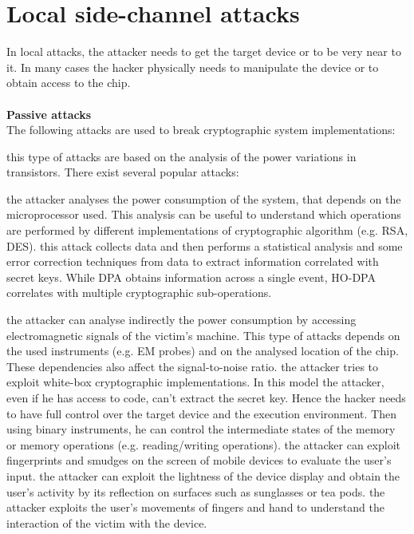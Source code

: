\section{Local side-channel attacks}
In local attacks, the attacker needs to get the target device or to be very near to it. In many cases the hacker physically needs to manipulate the device or to obtain access to the chip.\\\\
\textbf{Passive attacks}\\
The following attacks are used to break cryptographic system implementations:
\begin{itemize}
{this type of attacks are based on the analysis of the power variations in transistors. There exist several popular attacks\cite{intro_DPA}:
\begin{itemize}
{the attacker analyses the power consumption of the system, that depends on the microprocessor used. This analysis can be useful to understand which operations are performed by different implementations of cryptographic algorithm (e.g. RSA, DES).}
{this attack collects data and then performs a statistical analysis and some error correction techniques from data to extract information correlated with secret keys.}
{While DPA obtains information across a single event, HO-DPA correlates with multiple cryptographic sub-operations.}
\end{itemize}}
{the attacker can analyse indirectly the power consumption by accessing electromagnetic signals of the victim's machine. This type of attacks depends on the used instruments (e.g. EM probes) and on the analysed location of the chip. These dependencies also affect the signal-to-noise ratio.}
{the attacker tries to exploit white-box cryptographic implementations. In this model the attacker, even if he has access to code, can't extract the secret key. Hence the hacker needs to have full control over the target device and the execution environment. Then using binary instruments, he can control the intermediate states of the memory or memory operations (e.g. reading/writing operations)\cite{side_DCA}.}
{the attacker can exploit fingerprints and smudges on the screen of mobile devices to evaluate the user's input.}
{the attacker can exploit the lightness of the device display and obtain the user's activity by its reflection on surfaces such as sunglasses or tea pods.}
{the attacker exploits the user's movements of fingers and hand to understand the interaction of the victim with the device.}
\end{itemize}
